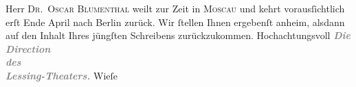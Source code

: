 \begin{ledgroupsized}[t]{13cm}
               Herr \textsc{Dr. Oscar Blumenthal} weilt zur Zeit in \textsc{Moscau} und kehrt vorausſichtlich erſt Ende April nach Berlin zurück. Wir ſtellen Ihnen ergebenſt anheim, alsdann auf
               den Inhalt Ihres jüngſten Schreibens zurückzukommen.\pend
           \pstart
           Hochachtungsvoll\pend
           \pstart
           \raggedleft{}\textcolor{gray}{\textbf{\textit{Die Direction}}}{\\}\textcolor{gray}{\textbf{\textit{des}}}{\\}\textcolor{gray}{\textbf{\textit{Lessing-Theaters.}}}\pend
           \pstart \spacefill\mbox{Wieſe}\pend{}
         
         \endnumbering{}\end{ledgroupsized}  \newcommand{\dateiname}{L00307}\newcommand{\titel}{Gerhard Wiese an Arthur Schnitzler, 21. 3. 1894}\newcommand{\editorInnen}{Martin Anton Müller und Gerd-Hermann Susen}
      